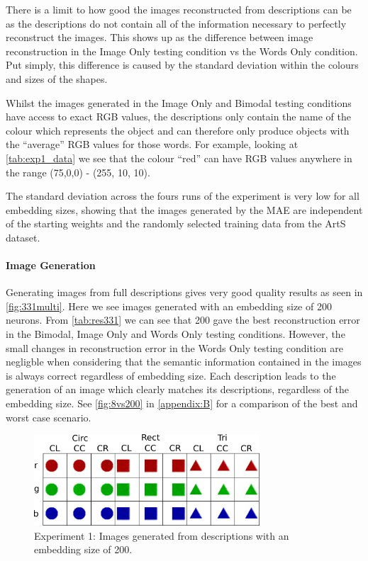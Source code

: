 There is a limit to how good the images reconstructed from descriptions can be as the descriptions do not contain all of the information necessary to perfectly reconstruct the images. This shows up as the difference between image reconstruction in the Image Only testing condition vs the Words Only condition. Put simply, this difference is caused by the standard deviation within the colours and sizes of the shapes. 

Whilst the images generated in the Image Only and Bimodal testing conditions have access to exact RGB values, the descriptions only contain the name of the colour  which represents the object and can therefore only produce objects with the ``average'' RGB values for those words. For example, looking at \autoref{tab:exp1_data} we see that the colour ``red'' can have RGB values anywhere in the range (75,0,0) - (255, 10, 10).

The standard deviation across the fours runs of the experiment is very low for all embedding sizes, showing that the images generated by the MAE are independent of the starting weights and the randomly selected training data from the ArtS dataset. 

\paragraph{Image Generation}

Generating images from full descriptions gives very good quality results as seen in \autoref{fig:331multi}. Here we see images generated with an embedding size of 200 neurons. From \autoref{tab:res331} we can see that 200 gave the best reconstruction error in the Bimodal, Image Only and Words Only testing conditions. However, the small changes in reconstruction error in the Words Only testing condition are negligble when considering that the semantic information contained in the images is always correct regardless of embedding size. Each description leads to the generation of an image which clearly matches its descriptions, regardless of the embedding size. See \autoref{fig:8vs200} in \autoref{appendix:B} for a comparison of the best and worst case scenario.

\begin{figure}[h]
\centering
\includegraphics[width=0.75\textwidth]{Figs/shapes/multiword331.png}
\caption{Experiment 1:  Images generated from descriptions with an embedding size of 200.}
\label{fig:331multi}
\end{figure}

